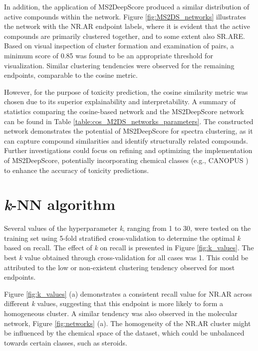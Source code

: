 In addition, the application of MS2DeepScore \cite{huber_MS2deepscore_2021} produced a similar distribution of active compounds within the network. Figure \ref{fig:MS2DS_networks} illustrates the network with the NR.AR endpoint labels, where it is evident that the active compounds are primarily clustered together, and to some extent also SR.ARE. Based on visual inspection of cluster formation and examination of pairs, a minimum score of 0.85 was found to be an appropriate threshold for visualization. Similar clustering tendencies were observed for the remaining endpoints, comparable to the cosine metric.

However, for the purpose of toxicity prediction, the cosine similarity metric was chosen due to its superior explainability and interpretability. A summary of statistics comparing the cosine-based network and the MS2DeepScore network can be found in Table \ref{table:cos_M2DS_networks_parameters}. The constructed network demonstrates the potential of MS2DeepScore for spectra clustering, as it can capture compound similarities and identify structurally related compounds. Further investigations could focus on refining and optimizing the implementation of MS2DeepScore, potentially incorporating chemical classes (e.g., CANOPUS \cite{Dhrkop2020}) to enhance the accuracy of toxicity predictions.

\section*{\textit{k}-NN algorithm}

Several values of the hyperparameter \textit{k}, ranging from 1 to 30, were tested on the training set using 5-fold stratified cross-validation to determine the optimal \textit{k} based on recall. The effect of \textit{k} on recall is presented in Figure \ref{fig:k_values}. The best \textit{k} value obtained through cross-validation for all cases was 1. This could be attributed to the low or non-existent clustering tendency observed for most endpoints.

Figure \ref{fig:k_values} (a) demonstrates a consistent recall value for NR.AR across different \textit{k} values, suggesting that this endpoint is more likely to form a homogeneous cluster. A similar tendency was also observed in the molecular network, Figure \ref{fig:networks} (a). The homogeneity of the NR.AR cluster might be influenced by the chemical space of the dataset, which could be unbalanced towards certain classes, such as steroids.

